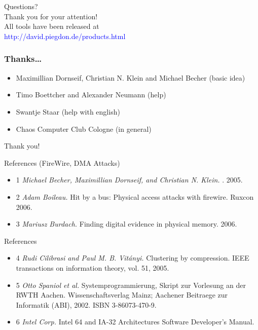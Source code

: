\documentclass{beamer}
\newenvironment{itemizeframe}[1]
  {\begin{frame}{#1}\startitemizeframe}
  {\stopitemizeframe\end{frame}}
\newcommand\startitemizeframe{\begin{itemize}}
\newcommand\stopitemizeframe{\end{itemize}}
\begin{document}
\AtBeginSection{ }

\section*{}

	\begin{frame}
		\begin{center}
			\Large
			Questions? \\[1.5ex]
			
			Thank you for your attention! \\[1.5ex]
			
			\small
			All tools have been released at \\
			\textcolor{blue}{http://david.piegdon.de/products.html}
		\end{center}
	\end{frame}

	\begin{frame}
		\frametitle{Thanks\ldots}
		\begin{itemize}
			\item Maximillian Dornseif, Christian N. Klein and Michael Becher (basic idea)
			\item Timo Boettcher and Alexander Neumann (help)
			\item Swantje Staar (help with english)
			\item Chaos Computer Club Cologne (in general)
		\end{itemize}
		Thank you!
	\end{frame}

	\begin{itemizeframe}{References (FireWire, DMA Attacks)}
		\item[1] \emph{Michael Becher, Maximillian Dornseif, and Christian N.
			Klein.} . 2005.

		\item[2] \emph{Adam Boileau.} Hit by a bus: Physical access attacks with
			firewire. Ruxcon 2006.

		\item[3] \emph{Mariusz Burdach.} Finding digital evidence in physical memory. 2006.
	\end{itemizeframe}

	\begin{itemizeframe}{References}
		\item[4] \emph{Rudi Cilibrasi and Paul M. B. Vit\'anyi.} Clustering by compression.
			IEEE transactions on information theory, vol. 51, 2005.

		\item[5] \emph{Otto Spaniol et al.} Systemprogrammierung, Skript zur Vorlesung an der RWTH
			Aachen. Wissenschaftsverlag Mainz; Aachener Beitraege zur Informatik (ABI),
			2002. ISBN 3-86073-470-9.
			
		\item[6] \emph{Intel Corp.} Intel 64 and IA-32 Architectures Software Developer’s Manual.
	\end{itemizeframe}
\end{document}

